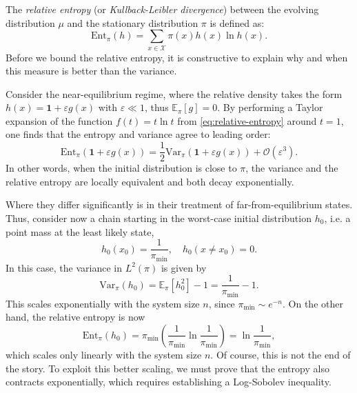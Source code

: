 The \textit{relative entropy} (or \textit{Kullback-Leibler divergence}) between the evolving distribution $\mu$ and the stationary distribution $\pi$ is defined as:
\begin{equation}
    \label{eq:relative-entropy}
    \text{Ent}_\pi(h) = \sum_{x\in\mathcal{X}} \pi(x) h(x) \ln h(x).
\end{equation}
Before we bound the relative entropy, it is constructive to explain why and when this measure is better than the variance. 

Consider the near-equilibrium regime, where the relative density takes the form $h(x) = \mathbf{1} + \varepsilon g(x)$ with $\varepsilon \ll 1$, thus $\mathbb{E}_\pi[g] = 0$. By performing a Taylor expansion of the function $f(t) = t \ln t $ from \eqref{eq:relative-entropy} around $t=1$, one finds that the entropy and variance agree to leading order:
\begin{equation} 
    \text{Ent}_\pi(\mathbf{1} + \varepsilon g(x)) = \frac{1}{2} \text{Var}_\pi(\mathbf{1} + \varepsilon g(x)) + \mathcal{O}(\varepsilon^3).
\end{equation}
In other words, when the initial distribution is close to $\pi$, the variance and the relative entropy are locally equivalent and both decay exponentially. 

Where they differ significantly is in their treatment of far-from-equilibrium states. Thus, consider now a chain starting in the worst-case initial distribution $h_0$, i.e. a point mass at the least likely state,
$$
h_0(x_0) = \frac{1}{\pi_{\min}}, \quad h_0(x\neq x_0) = 0.
$$
In this case, the variance in $L^2(\pi)$ is given by
\begin{equation}
    \mathrm{Var}_\pi(h_0) = \mathbb{E}_\pi[h_0^2] - 1 = \frac{1}{\pi_{\min}} - 1. 
\end{equation}
This scales exponentially with the system size $n$, since $\pi_{\min}\sim e^{-n}$. On the other hand, the relative entropy is now 
\begin{equation}
    \label{eq:initial-entropy}
    \mathrm{Ent}_\pi(h_0) = \pi_{\min} \left(\frac{1}{\pi_{\min}} \ln \frac{1}{\pi_{\min}}\right) = \ln \frac{1}{\pi_{\min}},
\end{equation}
which scales only linearly with the system size $n$. Of course, this is not the end of the story. To exploit this better scaling, we must prove that the entropy also contracts exponentially, which requires establishing a Log-Sobolev inequality.

